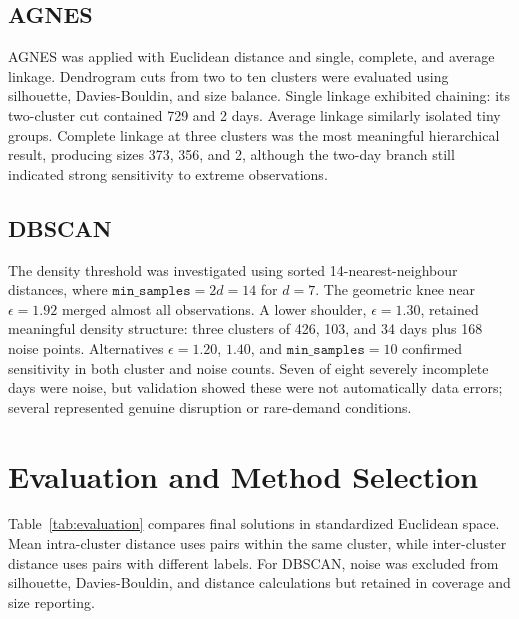 \documentclass[conference]{IEEEtran}
\begin{document}
\subsection{AGNES}
AGNES was applied with Euclidean distance and single, complete, and average linkage. Dendrogram cuts from two to ten clusters were evaluated using silhouette, Davies-Bouldin, and size balance. Single linkage exhibited chaining: its two-cluster cut contained 729 and 2 days. Average linkage similarly isolated tiny groups. Complete linkage at three clusters was the most meaningful hierarchical result, producing sizes 373, 356, and 2, although the two-day branch still indicated strong sensitivity to extreme observations.

\subsection{DBSCAN}
The density threshold was investigated using sorted 14-nearest-neighbour distances, where \(\texttt{min\_samples}=2d=14\) for \(d=7\). The geometric knee near \(\epsilon=1.92\) merged almost all observations. A lower shoulder, \(\epsilon=1.30\), retained meaningful density structure: three clusters of 426, 103, and 34 days plus 168 noise points. Alternatives \(\epsilon=1.20\), \(1.40\), and \(\texttt{min\_samples}=10\) confirmed sensitivity in both cluster and noise counts. Seven of eight severely incomplete days were noise, but validation showed these were not automatically data errors; several represented genuine disruption or rare-demand conditions.

\section{Evaluation and Method Selection}
Table~\ref{tab:evaluation} compares final solutions in standardized Euclidean space. Mean intra-cluster distance uses pairs within the same cluster, while inter-cluster distance uses pairs with different labels. For DBSCAN, noise was excluded from silhouette, Davies-Bouldin, and distance calculations but retained in coverage and size reporting.

\begin{table}[t]
\caption{Internal Evaluation of Final Clusterings}
\label{tab:evaluation}
\centering
\scriptsize
{}
\end{table}
\end{document}
